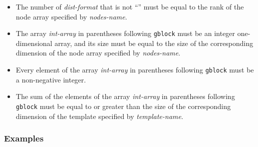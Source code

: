 \begin{itemize}
\item The number of {\it dist-format} that is not ``{\tt *}'' must be
      equal to the rank of the node array specified by {\it nodes-name}.  
\item The array {\it int-array} in parentheses following {\tt gblock}
      must be an integer one-dimensional array, and its size must be
      equal to the size of the corresponding dimension of the node array
      specified by {\it nodes-name}.
\item Every element of the array {\it int-array} in parentheses
      following {\tt gblock} must be a non-negative integer.
\item The sum of the elements of the array {\it int-array} in 
      parentheses following {\tt gblock} must be equal to or greater
      than the size of the corresponding dimension of the template
      specified by {\it template-name}.
\end{itemize}

\subsubsection*{Examples}

